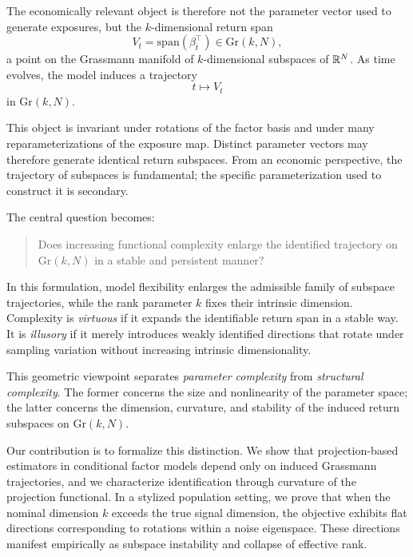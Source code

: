 \documentclass[twoside,11pt,letter]{article}
\begin{document}
The economically relevant object is therefore not the parameter vector used to generate exposures, but the $k$-dimensional return span
\begin{equation*}
V_t = \mathrm{span}(\beta_t^\top) \in \mathrm{Gr}(k,N),
\end{equation*}
a point on the Grassmann manifold of $k$-dimensional subspaces of $\mathbb{R}^N$. As time evolves, the model induces a trajectory
\begin{equation*}
t \longmapsto V_t
\end{equation*}
in $\mathrm{Gr}(k,N)$.

This object is invariant under rotations of the factor basis and under many reparameterizations of the exposure map. Distinct parameter vectors may therefore generate identical return subspaces. From an economic perspective, the trajectory of subspaces is fundamental; the specific parameterization used to construct it is secondary.

The central question becomes:

\begin{quote}
	Does increasing functional complexity enlarge the identified trajectory on $\mathrm{Gr}(k,N)$ in a stable and persistent manner?
\end{quote}

In this formulation, model flexibility enlarges the admissible family of subspace trajectories, while the rank parameter $k$ fixes their intrinsic dimension. Complexity is \emph{virtuous} if it expands the identifiable return span in a stable way. It is \emph{illusory} if it merely introduces weakly identified directions that rotate under sampling variation without increasing intrinsic dimensionality.

This geometric viewpoint separates \emph{parameter complexity} from \emph{structural complexity}. The former concerns the size and nonlinearity of the parameter space; the latter concerns the dimension, curvature, and stability of the induced return subspaces on $\mathrm{Gr}(k,N)$.

Our contribution is to formalize this distinction. We show that projection-based estimators in conditional factor models depend only on induced Grassmann trajectories, and we characterize identification through curvature of the projection functional. In a stylized population setting, we prove that when the nominal dimension $k$ exceeds the true signal dimension, the objective exhibits flat directions corresponding to rotations within a noise eigenspace. These directions manifest empirically as subspace instability and collapse of effective rank.
\end{document}
